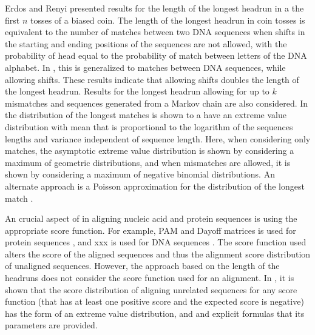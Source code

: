 Erdos and Renyi \citep{erdos1975length} presented results for the length
of the longest headrun in a the first $n$ tosses of a biased coin.  The
length of the longest headrun in coin tosses is equivalent to the number
of matches between two DNA sequences when shifts in the starting and
ending positions of the sequences are not allowed, with the probability
of head equal to the probability of match between letters of the DNA
alphabet.
In \citep{arratia1985erdos}, this is generalized to matches between DNA
sequences, while allowing shifts. These results indicate that allowing
shifts doubles the length of the longest headrun. Results for the
longest headrun allowing for up to $k$ mismatches and sequences
generated from a Markov chain are also considered.
In \citep{arratia1986extreme,gordon1986extreme} the distribution of the
longest matches is shown to a have an extreme value distribution with
mean that is proportional to the logarithm of the sequences lengths and
variance independent of sequence length. Here, when considering only
matches, the asymptotic extreme value distribution is shown by
considering a maximum of geometric distributions, and when mismatches
are allowed, it is shown by considering a maximum of negative binomial
distributions.
An alternate approach is a Poisson approximation for the distribution of
the longest match \citep{arratia1989erdos}.

An crucial aspect of in aligning nucleic acid and protein sequences is
using the appropriate score function. For example, PAM and Dayoff
matrices is used for protein sequences \citep{}, and xxx is used for DNA
sequences \citep{}.  The score function used alters the score of the
aligned sequences and thus the alignment score distribution of unaligned
sequences.
However, the approach based on the length of the headruns does not
consider the score function used for an alignment.
%
In \citep{}, it is shown that the score distribution of aligning
unrelated sequences for any score function (that has at least one
positive score and the expected score is negative) has the form of an
extreme value distribution, and and explicit formulas that its parameters
are provided.




